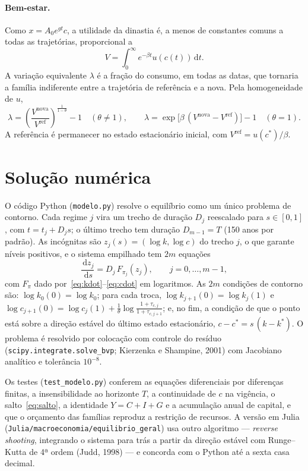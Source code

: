 \documentclass[11pt,a4paper]{article}
\newcommand{\dd}{\,\mathrm{d}}
\begin{document}
\paragraph{Bem-estar.} Como $x=A_0e^{gt}c$, a utilidade da dinastia é, a menos
de constantes comuns a todas as trajetórias, proporcional a
\begin{equation}
 V=\int_0^\infty e^{-\beta t}u(c(t))\dd t.
 \label{eq:valor}
\end{equation}
A variação equivalente $\lambda$ é a fração do consumo, em todas as datas,
que tornaria a família indiferente entre a trajetória de referência e a nova.
Pela homogeneidade de $u$,
\begin{equation}
 \lambda=\left(\frac{V^{\text{nova}}}{V^{\text{ref}}}\right)^{\frac1{1-\theta}}-1
 \quad(\theta\neq1),
 \qquad
 \lambda=\exp\bigl[\beta\,(V^{\text{nova}}-V^{\text{ref}})\bigr]-1
 \quad(\theta=1).
 \label{eq:lambda}
\end{equation}
A referência é permanecer no estado estacionário inicial, com
$V^{\text{ref}}=u(c^*)/\beta$.

\section{Solução numérica}
\label{sec:numerico}

O código Python (\texttt{modelo.py}) resolve o equilíbrio como um único problema
de contorno. Cada regime $j$ vira um trecho de duração $D_j$ reescalado para
$s\in[0,1]$, com $t=t_j+D_js$; o último trecho tem duração $D_{m-1}=T$
(150 anos por padrão). As incógnitas são $z_j(s)=(\log k,\log c)$ do trecho
$j$, o que garante níveis positivos, e o sistema empilhado tem $2m$ equações
\[
 \frac{\dd z_j}{\dd s}=D_j\,F_{\pi_j}(z_j),\qquad j=0,\dots,m-1,
\]
com $F_\pi$ dado por~\eqref{eq:kdot}--\eqref{eq:cdot} em logaritmos. As $2m$
condições de contorno são: $\log k_0(0)=\log k_0$; para cada troca,
$\log k_{j+1}(0)=\log k_j(1)$ e $\log c_{j+1}(0)=\log c_j(1)+\frac1\theta\log\frac{1+\tau_{c,j}}{1+\tau_{c,j+1}}$;
e, no fim, a condição de que o ponto está sobre a direção estável do último
estado estacionário, $c-c^*=s\,(k-k^*)$. O problema é resolvido por colocação
com controle do resíduo (\texttt{scipy.integrate.solve\_bvp}; Kierzenka e
Shampine, 2001) com Jacobiano analítico e tolerância $10^{-8}$.

Os testes (\texttt{test\_modelo.py}) conferem as equações diferenciais por
diferenças finitas, a insensibilidade ao horizonte $T$, a continuidade de $c$
na vigência, o salto~\eqref{eq:salto}, a identidade $Y=C+I+G$ e a acumulação
anual de capital, e que o orçamento das famílias reproduz a restrição de
recursos. A versão em Julia (\nolinkurl{Julia/macroeconomia/equilibrio_geral})
usa outro algoritmo --- \emph{reverse shooting}, integrando o sistema para trás
a partir da direção estável com Runge--Kutta de 4ª ordem (Judd, 1998) --- e
concorda com o Python até a sexta casa decimal.
\end{document}
